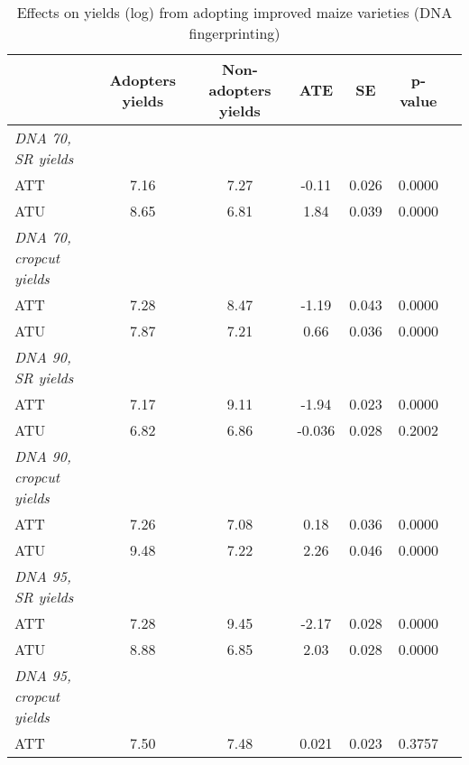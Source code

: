 \begin{table}[H]
\centering
\hspace*{-1.2cm}
\begin{threeparttable}
\caption{Effects on yields (log) from adopting improved maize varieties (DNA fingerprinting)}
\label{tab:switch2}
\begin{tabular}{l cccccc}
\hline
\hline
            &Adopters yields&Non-adopters yields&         ATE&          SE&     p-value\\
\hline
\textit{DNA 70, SR yields}&            &            &            &            &            \\
ATT         &        7.16&        7.27&       -0.11&       0.026&      0.0000\\
%
%
%
ATU         &        8.65&        6.81&        1.84&       0.039&      0.0000\\
%
%
%
\textit{DNA 70, cropcut yields}&            &            &            &            &            \\
ATT         &        7.28&        8.47&       -1.19&       0.043&      0.0000\\
%
%
%
ATU         &        7.87&        7.21&        0.66&       0.036&      0.0000\\
%
%
%
\textit{DNA 90, SR yields}&            &            &            &            &            \\
ATT         &        7.17&        9.11&       -1.94&       0.023&      0.0000\\
%
%
%
ATU         &        6.82&        6.86&      -0.036&       0.028&      0.2002\\
%
%
%
\textit{DNA 90, cropcut yields}&            &            &            &            &            \\
ATT         &        7.26&        7.08&        0.18&       0.036&      0.0000\\
%
%
%
ATU         &        9.48&        7.22&        2.26&       0.046&      0.0000\\
%
%
%
\textit{DNA 95, SR yields}&            &            &            &            &            \\
ATT         &        7.28&        9.45&       -2.17&       0.028&      0.0000\\
%
%
%
ATU         &        8.88&        6.85&        2.03&       0.028&      0.0000\\
%
%
%
\textit{DNA 95, cropcut yields}&            &            &            &            &            \\
ATT         &        7.50&        7.48&       0.021&       0.023&      0.3757\\

\end{tabular}
\end{threeparttable}
\end{table}
